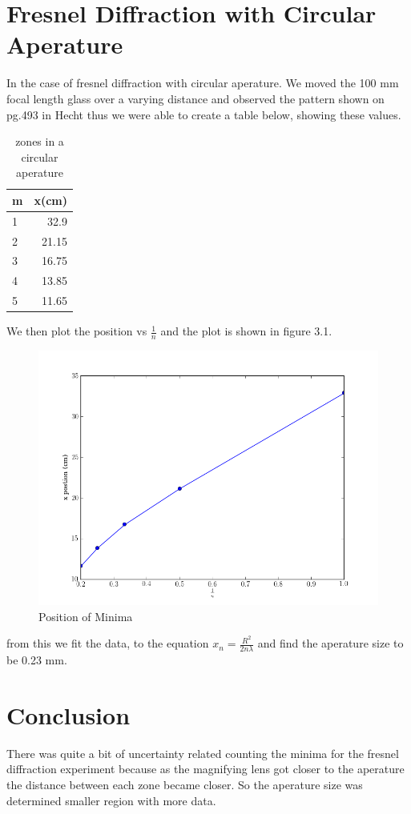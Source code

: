 \documentclass[paper=a4, fontsize=11pt]{scrartcl} %
\numberwithin{equation}{section}
\numberwithin{figure}{section}
\numberwithin{table}{section}
\begin{document}
\section{Fresnel Diffraction with Circular Aperature}
In the case of fresnel diffraction with circular aperature. We moved the 100 mm focal length glass over a varying distance and observed the pattern shown on pg.493 in Hecht thus we were able to create a table below, showing these values.
\begin{table}[H]
  \centering 
   \caption{zones in a circular aperature}
  \begin{tabular}{|l |r| }
    \hline
     m & x(cm) \\ \hline
     1 & 32.9 \\ \hline
     2 & 21.15 \\ \hline
     3 & 16.75 \\ \hline
     4 & 13.85  \\ \hline
     5 & 11.65 \\  \hline
  \end{tabular}
 \end{table}
We then plot the position vs $\frac{1}{n}$ and the plot is shown in figure 3.1.
\begin{figure}[H]
\caption{Position of Minima}
\begin{center}
\includegraphics[scale=0.3]{circf}
\end{center}
\end{figure}
from this we fit the data, to the equation $x_n = \frac{R^2}{2n\lambda}$ and find the aperature size to be 0.23 mm.
\section{Conclusion}
There was quite a bit of uncertainty related counting the minima for the fresnel diffraction experiment because as the magnifying lens got closer to the aperature the distance between each zone became closer. So the aperature size was determined smaller region with more data.
\end{document}
